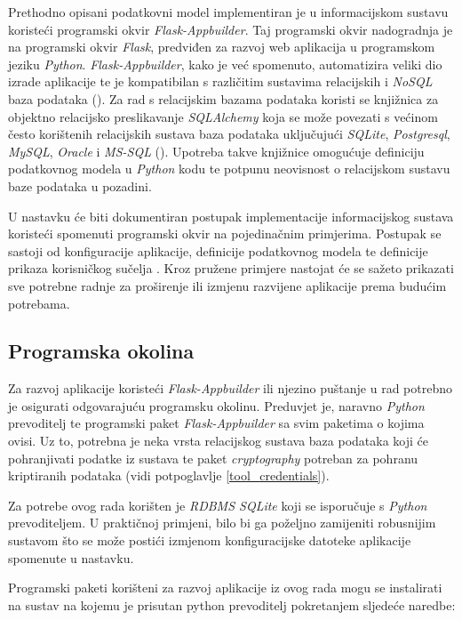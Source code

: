 \documentclass[times, utf8, diplomski]{fer}
\begin{document}
Prethodno opisani podatkovni model implementiran je u informacijskom sustavu
koristeći programski okvir \emph{Flask-Appbuilder}. Taj programski okvir
nadogradnja je na programski okvir \emph{Flask}, predviđen za razvoj web
aplikacija u programskom jeziku \emph{Python}. \emph{Flask-Appbuilder}, kako je
već spomenuto, automatizira veliki dio izrade aplikacije te je kompatibilan s
različitim sustavima relacijskih i \emph{NoSQL} baza podataka (\cite{fab}). Za
rad s relacijskim bazama podataka koristi se knjižnica za objektno relacijsko
preslikavanje  \emph{SQLAlchemy} koja se može povezati s većinom često
korištenih relacijskih sustava baza podataka  uključujući
\emph{SQLite}, \emph{Postgresql}, \emph{MySQL}, \emph{Oracle} i \emph{MS-SQL }
(\cite{sqlalchemy}). Upotreba takve knjižnice omogućuje definiciju podatkovnog
modela u \emph{Python} kodu te potpunu neovisnost o relacijskom sustavu baze
podataka u pozadini.

U nastavku će biti dokumentiran postupak implementacije informacijskog sustava
koristeći spomenuti programski okvir na pojedinačnim primjerima. Postupak se
sastoji od konfiguracije aplikacije, definicije podatkovnog modela te definicije
prikaza korisničkog sučelja . Kroz pružene primjere nastojat će
se sažeto prikazati sve potrebne radnje za proširenje ili izmjenu razvijene
aplikacije prema budućim potrebama.

\subsection{Programska okolina} \label{environ}

Za razvoj aplikacije koristeći \emph{Flask-Appbuilder} ili njezino puštanje u
rad potrebno je osigurati odgovarajuću programsku okolinu. Preduvjet je, naravno
\emph{Python} prevoditelj  te programski paket
\emph{Flask-Appbuilder} sa svim paketima o kojima ovisi. Uz to, potrebna je neka
vrsta relacijskog sustava baza podataka  koji će pohranjivati
podatke iz sustava te paket \emph{cryptography} potreban za pohranu kriptiranih
podataka (vidi potpoglavlje \ref{tool_credentials}).

Za potrebe ovog rada korišten je \emph{RDBMS SQLite} koji se isporučuje s
\emph{Python} prevoditeljem. U praktičnoj primjeni, bilo bi ga poželjno
zamijeniti robusnijim sustavom što se može postići izmjenom konfiguracijske
datoteke aplikacije spomenute u nastavku.

Programski paketi korišteni za razvoj aplikacije iz ovog rada mogu se
instalirati na sustav na kojemu je prisutan python prevoditelj pokretanjem
sljedeće naredbe:
\end{document}
